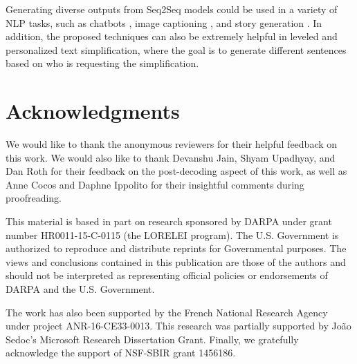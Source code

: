 \documentclass[11pt,a4paper]{article}
\begin{document}
Generating diverse outputs from Seq2Seq models could be used in a variety of NLP tasks, such as chatbots \cite{shao2017generating}, image captioning \cite{vijayakumar2018diverse}, and story generation \cite{fan2018hierarchical}. In addition, the proposed techniques can also be extremely helpful in leveled and personalized text simplification, where the goal is to generate different sentences based on who is requesting the simplification.

\section{Acknowledgments}

We would like to thank the anonymous reviewers for their helpful feedback on this work. We would also like to thank Devanshu Jain, Shyam Upadhyay, and Dan Roth for their feedback on the post-decoding aspect of this work, as well as Anne Cocos and Daphne Ippolito for their insightful comments during proofreading.

This  material  is  based  in  part  on  research  sponsored  by  DARPA  under  grant  number   HR0011-15-C-0115 (the LORELEI program). The U.S. Government is authorized to reproduce and distribute reprints for Governmental purposes. The views and conclusions contained in this publication are those of the authors and should not be interpreted as representing official policies or endorsements of DARPA and the U.S. Government.   

The  work  has  also  been  supported  by  the French National Research Agency under project ANR-16-CE33-0013. This research was partially supported by Jo\~{a}o Sedoc's Microsoft Research Dissertation Grant.
Finally, we gratefully acknowledge the support of NSF-SBIR grant 1456186. 




\end{document}
